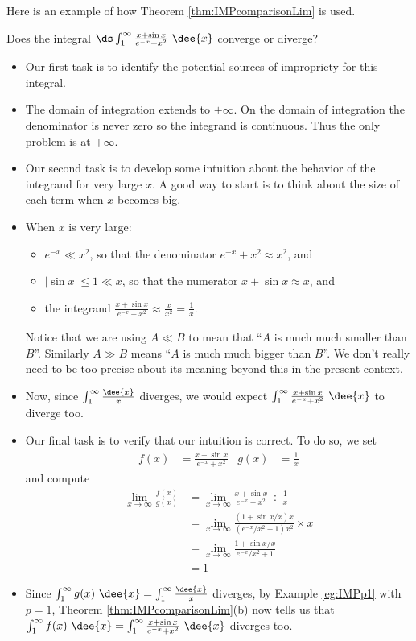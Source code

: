 Here is an example of how Theorem \ref{thm:IMPcomparisonLim} is used.
\begin{eg}\label{eg:IMPp8}
Does the integral
$\ds \int_1^\infty\frac{x+\sin x}{e^{-x}+x^2}\ \dee{x}$
converge or diverge?

\soln
\begin{itemize}
 \item Our first task is to identify the potential sources of impropriety for
this integral.

\item The domain of integration extends to $+\infty$. On the domain of
integration the denominator is never zero so the integrand is continuous. Thus
the only problem is at $+\infty$.

\item Our second task is to develop some intuition about the behavior of
the integrand for very large $x$. A good way to start is to think about the
size of each term when $x$ becomes big.

\item When $x$ is very large:
\begin{itemize}
\item $e^{-x} \ll x^2$, so that the denominator $e^{-x}+x^2\approx x^2$, and
\item $|\sin x|\le 1 \ll x$, so that the numerator $x+\sin x\approx x$, and
\item the integrand $\frac{x+\sin x}{e^{-x}+x^2} \approx \frac{x}{x^2}
                                      =\frac{1}{x}$.
\end{itemize}
Notice that we are using $A \ll B$ to mean that ``$A$ is much much
smaller than $B$''. Similarly $A\gg B$ means ``$A$ is much much bigger than
$B$''. We don't really need to be too precise about its meaning beyond
this in the present context.

\item Now, since $\int_1^\infty\frac{\dee{x}}{x}$ diverges, we would expect
$\int_1^\infty\frac{x+\sin x}{e^{-x}+x^2}\ \dee{x}$ to diverge too.

\item Our final task is to verify that our intuition is correct. To do so, we
set
\begin{align*}
f(x) &= \frac{x+\sin x}{e^{-x}+x^2} &
g(x) &= \frac{1}{x}
\end{align*}
and compute
\begin{align*}
\lim_{x\rightarrow\infty}\frac{f(x)}{g(x)}
&=\lim_{x\rightarrow\infty} \frac{x+\sin x}{e^{-x}+x^2}\div\frac{1}{x} \\
&=\lim_{x\rightarrow\infty} \frac{(1+\sin x/x)x}{(e^{-x}/x^2+1)x^2}\times x \\
&=\lim_{x\rightarrow\infty} \frac{1+\sin x/x}{e^{-x}/x^2+1} \\
&=1
\end{align*}
\item Since $\int_1^\infty g(x)\ \dee{x} = \int_1^\infty\frac{\dee{x}}{x}$
diverges, by Example \ref{eg:IMPp1} with $p=1$, Theorem
\ref{thm:IMPcomparisonLim}(b) now tells us that $\int_1^\infty f(x)\ \dee{x}
= \int_1^\infty\frac{x+\sin x}{e^{-x}+x^2}\ \dee{x}$  diverges too.


\end{itemize}
\end{eg}
